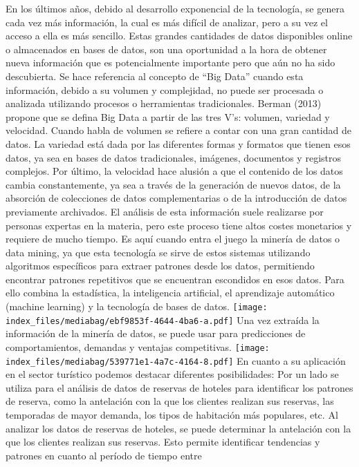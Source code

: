 \documentclass[
  letterpaper,
  DIV=11,
  numbers=noendperiod]{scrreprt}
\begin{document}
En los últimos años, debido al desarrollo exponencial de la tecnología,
se genera cada vez más información, la cual es más difícil de analizar,
pero a su vez el acceso a ella es más sencillo. Estas grandes cantidades
de datos disponibles online o almacenados en bases de datos, son una
oportunidad a la hora de obtener nueva información que es potencialmente
importante pero que aún no ha sido descubierta. Se hace referencia al
concepto de ``Big Data'' cuando esta información, debido a su volumen y
complejidad, no puede ser procesada o analizada utilizando procesos o
herramientas tradicionales. Berman (2013) propone que se defina Big Data
a partir de las tres V's: volumen, variedad y velocidad. Cuando habla de
volumen se refiere a contar con una gran cantidad de datos. La variedad
está dada por las diferentes formas y formatos que tienen esos datos, ya
sea en bases de datos tradicionales, imágenes, documentos y registros
complejos. Por último, la velocidad hace alusión a que el contenido de
los datos cambia constantemente, ya sea a través de la generación de
nuevos datos, de la absorción de colecciones de datos complementarias o
de la introducción de datos previamente archivados. El análisis de esta
información suele realizarse por personas expertas en la materia, pero
este proceso tiene altos costes monetarios y requiere de mucho tiempo.
Es aquí cuando entra el juego la minería de datos o data mining, ya que
esta tecnología se sirve de estos sistemas utilizando algoritmos
específicos para extraer patrones desde los datos, permitiendo encontrar
patrones repetitivos que se encuentran escondidos en esos datos. Para
ello combina la estadística, la inteligencia artificial, el aprendizaje
automático (machine learning) y la tecnología de bases de datos.
\texttt{[image: index\_files/mediabag/ebf9853f-4644-4ba6-a.pdf]} Una vez
extraída la información de la minería de datos, se puede usar para
predicciones de comportamientos, demandas y ventajas competitivas.
\texttt{[image: index\_files/mediabag/539771e1-4a7c-4164-8.pdf]} En
cuanto a su aplicación en el sector turístico podemos destacar
diferentes posibilidades: Por un lado se utiliza para el análisis de
datos de reservas de hoteles para identificar los patrones de reserva,
como la antelación con la que los clientes realizan sus reservas, las
temporadas de mayor demanda, los tipos de habitación más populares, etc.
Al analizar los datos de reservas de hoteles, se puede determinar la
antelación con la que los clientes realizan sus reservas. Esto permite
identificar tendencias y patrones en cuanto al período de tiempo entre
\end{document}
